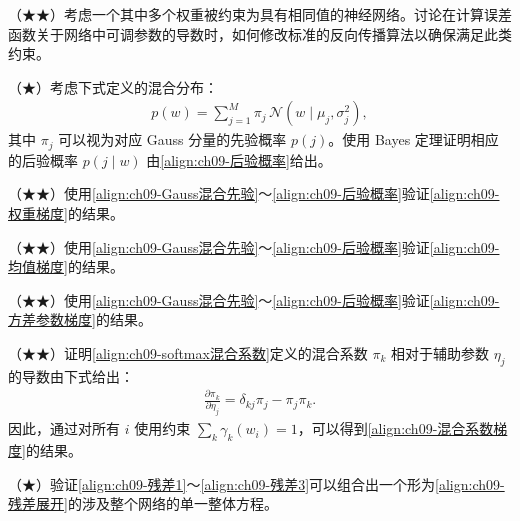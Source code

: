 \documentclass[../../main.tex]{subfiles}
\begin{document}
\begin{exercise}\label{exercise:ch09-07}
（★★）考虑一个其中多个权重被约束为具有相同值的神经网络。讨论在计算误差函数关于网络中可调参数的导数时，如何修改标准的反向传播算法以确保满足此类约束。
\end{exercise}

\begin{exercise}\label{exercise:ch09-08}
（★）考虑下式定义的混合分布：
\begin{align}
p(w)=\sum_{j=1}^{M}\pi_{j}\,\mathcal{N}\!\left(w\mid\mu_{j},\sigma_{j}^{2}\right),
\label{align:ch09-混合分布}
\end{align}
其中 $\pi_{j}$ 可以视为对应 Gauss 分量的先验概率 $p(j)$。使用 Bayes 定理证明相应的后验概率 $p(j\mid w)$ 由\eqref{align:ch09-后验概率}给出。
\end{exercise}

\begin{exercise}\label{exercise:ch09-09}
（★★）使用\eqref{align:ch09-Gauss混合先验}～\eqref{align:ch09-后验概率}验证\eqref{align:ch09-权重梯度}的结果。
\end{exercise}

\begin{exercise}\label{exercise:ch09-10}
（★★）使用\eqref{align:ch09-Gauss混合先验}～\eqref{align:ch09-后验概率}验证\eqref{align:ch09-均值梯度}的结果。
\end{exercise}

\begin{exercise}\label{exercise:ch09-11}
（★★）使用\eqref{align:ch09-Gauss混合先验}～\eqref{align:ch09-后验概率}验证\eqref{align:ch09-方差参数梯度}的结果。
\end{exercise}

\begin{exercise}\label{exercise:ch09-12}
（★★）证明\eqref{align:ch09-softmax混合系数}定义的混合系数 $\pi_{k}$ 相对于辅助参数 $\eta_{j}$ 的导数由下式给出：
\begin{align}
\frac{\partial\pi_{k}}{\partial\eta_{j}}=\delta_{kj}\pi_{j}-\pi_{j}\pi_{k}.
\label{align:ch09-混合系数导数}
\end{align}
因此，通过对所有 $i$ 使用约束 $\sum_{k}\gamma_{k}(w_{i})=1$，可以得到\eqref{align:ch09-混合系数梯度}的结果。
\end{exercise}

\begin{exercise}\label{exercise:ch09-13}
（★）验证\eqref{align:ch09-残差1}～\eqref{align:ch09-残差3}可以组合出一个形为\eqref{align:ch09-残差展开}的涉及整个网络的单一整体方程。
\end{exercise}
\end{document}
